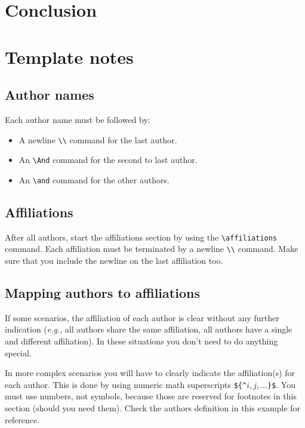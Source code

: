 \documentclass{article}
\begin{document}
\section{Conclusion}

\section{Template notes}

\subsection{Author names}

Each author name must be followed by:
\begin{itemize}
    \item A newline {\tt \textbackslash{}\textbackslash{}} command for the last author.
    \item An {\tt \textbackslash{}And} command for the second to last author.
    \item An {\tt \textbackslash{}and} command for the other authors.
\end{itemize}

\subsection{Affiliations}

After all authors, start the affiliations section by using the {\tt \textbackslash{}affiliations} command.
Each affiliation must be terminated by a newline {\tt \textbackslash{}\textbackslash{}} command. Make sure that you include the newline on the last affiliation too.

\subsection{Mapping authors to affiliations}

If some scenarios, the affiliation of each author is clear without any further indication (\emph{e.g.}, all authors share the same affiliation, all authors have a single and different affiliation). In these situations you don't need to do anything special.

In more complex scenarios you will have to clearly indicate the affiliation(s) for each author. This is done by using numeric math superscripts {\tt \$\{\^{}$i,j, \ldots$\}\$}. You must use numbers, not symbols, because those are reserved for footnotes in this section (should you need them). Check the authors definition in this example for reference.
\end{document}
